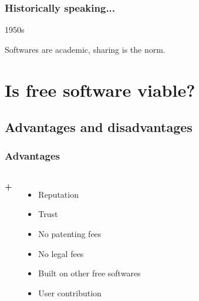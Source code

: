 \documentclass{beamer}
\begin{document}
\begin{frame}

  \frametitle{Historically speaking...}

  \begin{block}{1950s}
    \begin{center}Softwares are academic, sharing is the norm.\end{center}
  \end{block}



\end{frame}

\section{Is free software viable?}

\subsection{Advantages and disadvantages}

\begin{frame}

  \frametitle{Advantages}

  \begin{columns}

    \begin{center}
      \Huge{\textbf{+}}
    \end{center}

    \begin{itemize}
      \item<2->{Reputation}
      \item<3->{Trust}
      \item<4->{No patenting fees}
      \item<5->{No legal fees}
      \item<6->{Built on other free softwares}
      \item<7>{User contribution}
    \end{itemize}

  \end{columns}

\end{frame}
\end{document}

